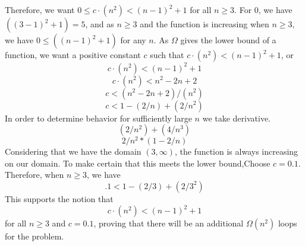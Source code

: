 \documentclass{article}
\begin{document}
Therefore, we want $0 \leq c \cdot (n^2) <(n-1)^2 +1$ for all $n \geq 3$. For $0$, we have $((3-1)^2 +1)=5$, and as  $n \geq 3$ and the function is increasing when $n \geq 3$, we have $0 \leq ((n-1)^2 +1)$ for any $n$. As $\Omega$ gives the lower bound of a function, we want a positive constant $c$ such that $c \cdot (n^2) <(n-1)^2 +1$, or 
\[
c \cdot (n^2) <(n-1)^2 +1
\]
\[
c \cdot (n^2) <n^2-2n+2
\]
\[
c  <(n^2-2n+2)/(n^2) 
\]
\[
c  <1-(2/n)+(2/n^2)
\]
In order to determine behavior for sufficiently large $n$ we take derivative. 
\[
(2/n^2)+(4/n^3)
\]
\[
2/n^2 * (1-2/n)
\]
Considering that we have the domain $(3,\infty)$, the function is always increasing on our domain. To make certain that this meets the lower bound,Choose $c=0.1$. Therefore, when $n \geq 3$, we have 
\[
.1  <1-(2/3)+(2/3^2)
\]
This supports the notion that 
\[
c \cdot (n^2) <(n-1)^2 +1
\]
for all $n \geq 3$ and $c=0.1$, proving that there will be an additional $\Omega(n^2)$ loops for the problem. \newline 
\end{document}
